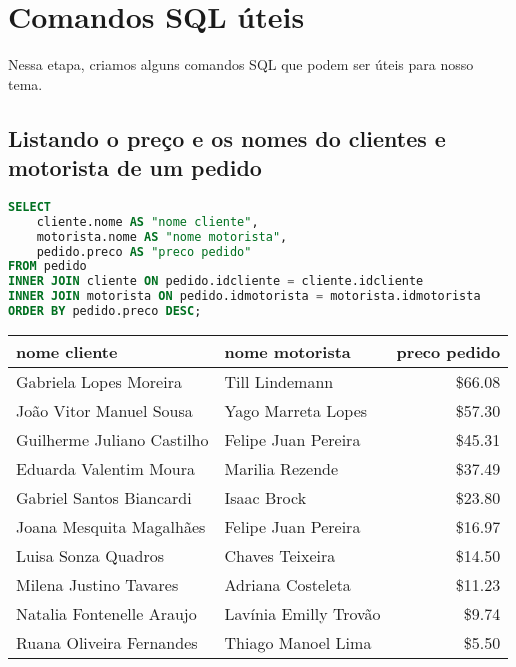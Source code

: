 \documentclass{article}
\begin{document}
\section{Comandos SQL úteis}

Nessa etapa, criamos alguns comandos SQL que podem ser úteis para nosso tema.

\subsection{Listando o preço e os nomes do clientes e motorista de um pedido}

\begin{lstlisting}[language=SQL]
SELECT 
    cliente.nome AS "nome cliente",
    motorista.nome AS "nome motorista",
    pedido.preco AS "preco pedido"
FROM pedido
INNER JOIN cliente ON pedido.idcliente = cliente.idcliente
INNER JOIN motorista ON pedido.idmotorista = motorista.idmotorista
ORDER BY pedido.preco DESC;
\end{lstlisting}


\begin{table}[h]
\centering
\begin{tabular}{l|l|r}
    
\textbf{nome cliente} & \textbf{nome motorista} & \textbf{preco pedido} \\
\hline
 Gabriela Lopes Moreira     & Till Lindemann        &       \$66.08 \\
 João Vitor Manuel Sousa    & Yago Marreta Lopes    &       \$57.30 \\
 Guilherme Juliano Castilho & Felipe Juan Pereira   &       \$45.31 \\
 Eduarda Valentim Moura     & Marilia Rezende       &       \$37.49 \\
 Gabriel Santos Biancardi   & Isaac Brock           &       \$23.80 \\
 Joana Mesquita Magalhães   & Felipe Juan Pereira   &       \$16.97 \\
 Luisa Sonza Quadros        & Chaves Teixeira       &       \$14.50 \\
 Milena Justino Tavares     & Adriana Costeleta     &       \$11.23 \\
 Natalia Fontenelle Araujo  & Lavínia Emilly Trovão &       \$9.74 \\
 Ruana Oliveira Fernandes   & Thiago Manoel Lima    &       \$5.50 

\end{tabular}
\end{table}
\end{document}
